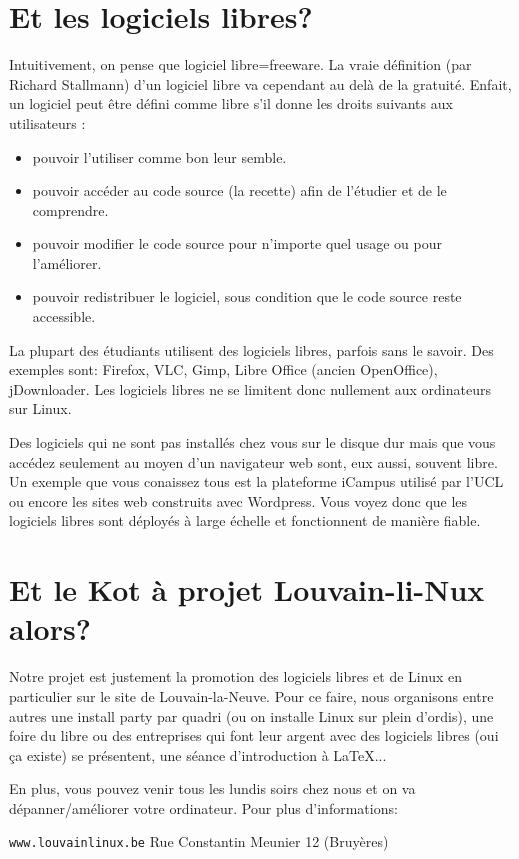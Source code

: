 \documentclass[12pt,a4paper]{article}
\begin{document}
\section*{Et les logiciels libres?}
Intuitivement, on pense que logiciel libre=freeware.
La vraie définition (par Richard Stallmann) d'un logiciel libre va cependant au delà de la gratuité.
Enfait, un logiciel peut être défini comme libre s'il donne les droits suivants aux utilisateurs :

\begin{itemize}
\item pouvoir l’utiliser comme bon leur semble.
\item pouvoir accéder au code source (la recette) afin de l’étudier et de le comprendre.
\item pouvoir modifier le code source pour n’importe quel usage ou pour l’améliorer.
\item pouvoir redistribuer le logiciel, sous condition que le code source reste accessible.
\end{itemize}

La plupart des étudiants utilisent des logiciels libres, parfois sans le savoir.
Des exemples sont: Firefox, VLC, Gimp, Libre Office (ancien OpenOffice), jDownloader.
Les logiciels libres ne se limitent donc nullement aux ordinateurs sur Linux.

Des logiciels qui ne sont pas installés chez vous sur le disque dur mais
que vous accédez seulement au moyen d'un navigateur web sont, eux aussi, souvent libre.
Un exemple que vous conaissez tous est la plateforme iCampus utilisé par l'UCL
ou encore les sites web construits avec Wordpress. Vous voyez donc que les logiciels 
libres sont déployés à large échelle et fonctionnent de manière fiable.

\section*{Et le Kot à projet Louvain-li-Nux alors?}
Notre projet est justement la promotion des logiciels libres et de Linux en particulier sur le site de Louvain-la-Neuve.
Pour ce faire, nous organisons entre autres une install party par quadri (ou on installe Linux sur plein d'ordis),
une foire du libre ou des entreprises qui font leur argent avec des logiciels libres (oui ça existe) se présentent,
une séance d'introduction à \LaTeX{}...

En plus, vous pouvez venir tous les lundis soirs chez nous et on va dépanner/améliorer votre ordinateur.
Pour plus d'informations:

\begin{center}\texttt{www.louvainlinux.be} \hspace{0.5cm}Rue Constantin Meunier 12 (Bruyères)\end{center}
                                                                                                                       
\end{document}
